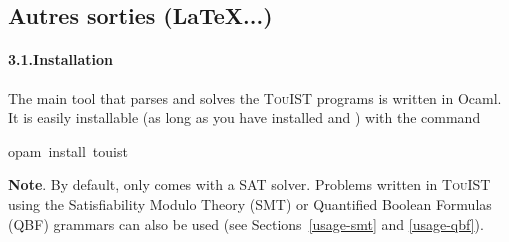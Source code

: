 %
%
\subsection{Autres sorties (\LaTeX...)}




\paragraph*{3.1.\hspace*{0.5em}Installation}\label{sec-installation}%

\noindent The main tool that parses and solves the {\scshape TouIST} programs is written in
Ocaml. It is easily installable (as long as you have installed 
and ) with the command%
\begin{mdpre}%
\noindent{}opam~install~touist%
\end{mdpre}
\noindent\textbf{Note}.
By default,  only comes with a SAT solver. Problems written in
{\scshape TouIST} using the Satisfiability Modulo Theory (SMT) or Quantified
Boolean Formulas (QBF) grammars can also be used (see Sections~\ref{usage-smt} and
\ref{usage-qbf}).%

\noindent{}%


